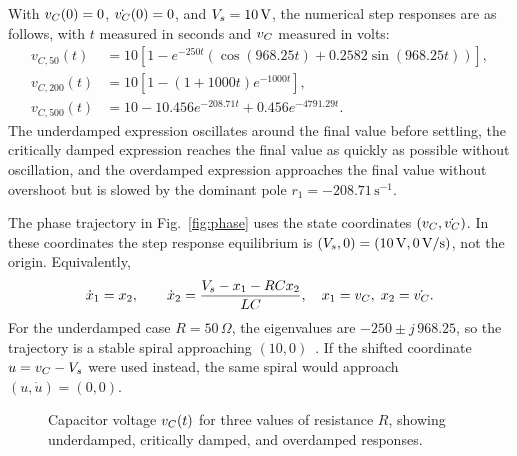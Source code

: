 With $v_C(0)=0$, $\dot{v_C}(0)=0$, and $V_s=10\,\mathrm{V}$, the numerical
step responses are as follows, with $t$ measured in seconds and $v_C$ measured
in volts:
\begin{align}
  v_{C,50}(t)
    &= 10\!\left[
      1 - e^{-250t}\!\left(\cos(968.25t)
      + 0.2582\sin(968.25t)\right)\right],
      \label{eq:under_numeric}\\
  v_{C,200}(t)
    &= 10\!\left[1 - (1 + 1000t)e^{-1000t}\right],
      \label{eq:crit_numeric}\\
  v_{C,500}(t)
    &= 10 - 10.456e^{-208.71t} + 0.456e^{-4791.29t}.
      \label{eq:over_numeric}
\end{align}
The underdamped expression oscillates around the final value before
settling, the critically damped expression reaches the final value as quickly
as possible without oscillation, and the overdamped expression approaches the
final value without overshoot but is slowed by the dominant pole
$r_1 = -208.71\,\mathrm{s}^{-1}$.

The phase trajectory in Fig.~\ref{fig:phase} uses the state coordinates
$(v_C,\dot{v_C})$. In these coordinates the step response equilibrium is
$(V_s,0)=(10\,\mathrm{V},0\,\mathrm{V/s})$, not the origin.
Equivalently,
\begin{equation}
  \dot{x}_1 = x_2, \qquad
  \dot{x}_2 = \frac{V_s - x_1 - RCx_2}{LC},
  \quad x_1=v_C,\;x_2=\dot{v_C}.
  \label{eq:state_phase}
\end{equation}
For the underdamped case $R=50\,\Omega$, the eigenvalues are
$-250 \pm j\,968.25$, so the trajectory is a stable spiral approaching
$(10,0)$~\cite{nilsson2019}. If the shifted coordinate $u=v_C-V_s$ were used instead, the same
spiral would approach $(u,\dot{u})=(0,0)$.

\begin{figure}[htbp]
  \centering
  \caption{Capacitor voltage $v_C(t)$ for three values of resistance $R$,
           showing underdamped, critically damped, and overdamped responses.}
  \label{fig:vc_vs_t}
\end{figure}

